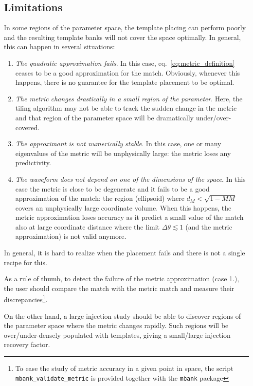 \documentclass[twocolumn,showpacs,preprintnumbers,nofootinbib,prd,
superscriptaddress,10pt]{revtex4-2}
\begin{document}
\subsection{Limitations} \label{sec:limitations}

In some regions of the parameter space, the template placing can perform poorly and the resulting template banks will not cover the space optimally.
In general, this can happen in several situations:

\begin{enumerate}
	\item {\it The quadratic approximation fails}. In this case, eq.~\eqref{eq:metric_definition} ceases to be a good approximation for the match. Obviously, whenever this happens, there is no guarantee for the template placement to be optimal.
	\item {\it The metric changes drastically in a small region of the parameter}. Here, the tiling algorithm may not be able to track the sudden change in the metric and that region of the parameter space will be dramatically under/over-covered.
	\item {\it The approximant is not numerically stable}. In this case, one or many eigenvalues of the metric will be unphysically large: the metric loses any predictivity.
	\item {\it The waveform does not depend on one of the dimensions of the space}. In this case the metric is close to be degenerate and it fails to be a good approximation of the match: the region (ellipsoid) where $d_M<\sqrt{1-MM}$ covers an unphysically large coordinate volume. When this happens, the metric approximation loses accuracy as it predict a small value of the match also at large coordinate distance where the limit $\Delta\theta \lesssim 1$ (and the metric approximation) is not valid anymore.
\end{enumerate}

In general, it is hard to realize when the placement fails and there is not a single recipe for this.

As a rule of thumb, to detect the failure of the metric approximation (case 1.), the user should compare the match with the metric match and measure their discrepancies\footnote{To ease the study of metric accuracy in a given point in space, the script \texttt{mbank\_validate\_metric} is provided together with the \texttt{mbank} package}.

On the other hand, a large injection study should be able to discover regions of the parameter space where the metric changes rapidly. Such regions will be over/under-densely populated with templates, giving a small/large injection recovery factor.
\end{document}
